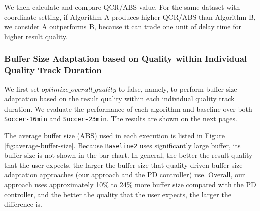 \documentclass[a4paper, 11pt, twoside]{report}
\begin{document}
We then calculate and compare QCR/ABS value. For the same dataset with coordinate setting, if Algorithm A produces higher QCR/ABS than Algorithm B, we consider A outperforms B, because it can trade one unit of delay time for higher result quality.\\

\clearpage
\subsubsection{Buffer Size Adaptation based on Quality within Individual Quality Track Duration}
\label{subsec:optimize-quality-for-each-duration}

We first set $optimize\_overall\_quality$ to false, namely, to perform buffer size adaptation based on the result quality within each individual quality track duration. We evaluate the performance of each algorithm and baseline over both \texttt{Soccer-16min} and \texttt{Soccer-23min}. The results are shown on the next pages.\\

\clearpage

The average buffer size (ABS) used in each execution is listed in Figure \ref{fig:average-buffer-size}. Because \texttt{Baseline2} uses significantly large buffer, its buffer size is not shown in the bar chart. In general, the better the result quality that the user expects, the larger the buffer size that quality-driven buffer size adaptation approaches (our approach and the PD controller) use. Overall, our approach uses approximately 10\% to 24\% more buffer size compared with the PD controller, and the better the quality that the user expects, the larger the difference is.\\
\end{document}
